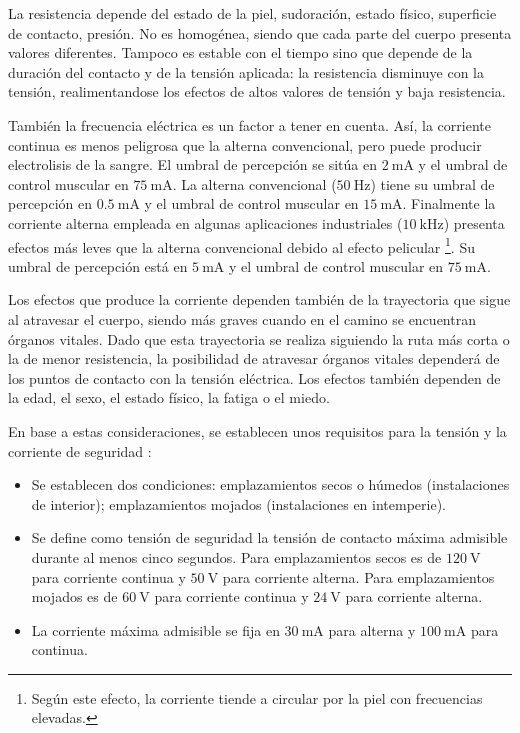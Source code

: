 La resistencia depende del estado de la piel, sudoración, estado físico,
superficie de contacto, presión. No es homogénea, siendo que cada
parte del cuerpo presenta valores diferentes. Tampoco es estable con
el tiempo sino que depende de la duración del contacto y de la tensión
aplicada: la resistencia disminuye con la tensión, realimentandose
los efectos de altos valores de tensión y baja resistencia. 

También la frecuencia eléctrica es un factor a tener en cuenta. Así,
la corriente continua es menos peligrosa que la alterna convencional,
pero puede producir electrolisis de la sangre. El umbral de percepción
se sitúa en $\SI{2}{\milli\ampere}$ y el umbral de control muscular
en $\SI{75}{\milli\ampere}$. La alterna convencional ($\SI{50}{\hertz}$)
tiene su umbral de percepción en $\SI{0.5}{\milli\ampere}$ y el umbral
de control muscular en $\SI{15}{\milli\ampere}$. Finalmente la corriente
alterna empleada en algunas aplicaciones industriales ($\SI{10}{\kilo\hertz}$)
presenta efectos más leves que la alterna convencional debido al efecto
pelicular%
\footnote{Según este efecto, la corriente tiende a circular por la piel con
frecuencias elevadas.%
}. Su umbral de percepción está en $\SI{5}{\milli\ampere}$ y el umbral
de control muscular en $\SI{75}{\milli\ampere}$.

Los efectos que produce la corriente dependen también de la trayectoria
que sigue al atravesar el cuerpo, siendo más graves cuando en el camino
se encuentran órganos vitales. Dado que esta trayectoria se realiza
siguiendo la ruta más corta o la de menor resistencia, la posibilidad
de atravesar órganos vitales dependerá de los puntos de contacto con
la tensión eléctrica. Los efectos también dependen de la edad, el
sexo, el estado físico, la fatiga o el miedo. 

En base a estas consideraciones, se establecen unos requisitos para
la tensión y la corriente de seguridad \citep{RD_842_2002,Gomez-Vidal2000,MestreRovira2002,PerezGabarda2000}: 
\begin{itemize}
\item Se establecen dos condiciones: emplazamientos secos o húmedos (instalaciones
de interior); emplazamientos mojados (instalaciones en intemperie).
\item Se define como tensión de seguridad la tensión de contacto máxima
admisible durante al menos cinco segundos. Para emplazamientos secos
es de $\SI{120}{\volt}$ para corriente continua y $\SI{50}{\volt}$
para corriente alterna. Para emplazamientos mojados es de $\SI{60}{\volt}$
para corriente continua y $\SI{24}{\volt}$ para corriente alterna.
\item La corriente máxima admisible se fija en $\SI{30}{\milli\ampere}$
para alterna y $\SI{100}{\milli\ampere}$ para continua.
\end{itemize}

